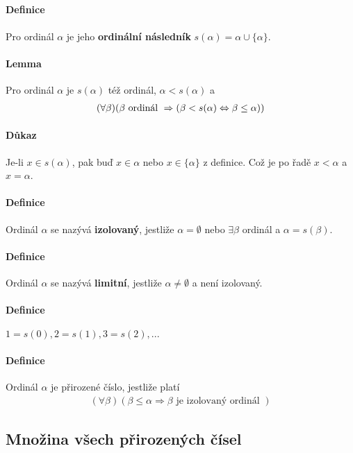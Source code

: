 \documentclass[a4paper,12pt,titlepage]{article}
\begin{document}
\subsection{}
\setcounter{equation}{0}
\paragraph{Definice}
Pro ordinál $\alpha$ je jeho \textbf{ordinální následník} $s(\alpha) = \alpha
\cup \{\alpha\}$.
\paragraph{Lemma}
Pro ordinál $\alpha$ je $s(\alpha)$ též ordinál, $\alpha < s(\alpha)$ a
\begin{align}
	(\forall \beta) (\beta \text{ ordinál } \Rightarrow ( \beta < s(\alpha)
	\Leftrightarrow \beta \le \alpha))
\end{align}
\paragraph{Důkaz}
Je-li $x \in s(\alpha)$, pak buď $x \in \alpha$ nebo $x \in \{\alpha\}$ z
definice. Což je po řadě $x < \alpha$ a $x = \alpha$.
\paragraph{Definice}
Ordinál $\alpha$ se nazývá \textbf{izolovaný}, jestliže $\alpha = \emptyset$ nebo
$\exists \beta$ ordinál a $\alpha = s(\beta)$.
\paragraph{Definice}
Ordinál $\alpha$ se nazývá \textbf{limitní}, jestliže $\alpha \neq \emptyset$ a není
izolovaný.
\paragraph{Definice}
$1 = s(0), 2 = s(1), 3 = s(2), ...$
\paragraph{Definice}
Ordinál $\alpha$ je přirozené číslo, jestliže platí
\begin{align}
	(\forall \beta)(\beta \le \alpha \Rightarrow \beta \text{ je izolovaný
	ordinál })
\end{align}


\subsection{Množina všech přirozených čísel}
\setcounter{equation}{0}
\end{document}

